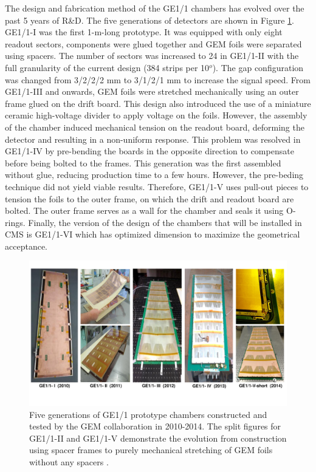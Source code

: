     The design and fabrication method of the GE1/1 chambers has evolved over the past 5 years of R\&D. The five generations of detectors are shown in Figure \ref{fig:II-1-generations}. GE1/1-I was the first 1-m-long prototype. It was equipped with only eight readout sectors, components were glued together and GEM foils were separated using spacers. The number of sectors was increased to 24 in GE1/1-II with the full granularity of the current design (384 strips per 10$^o$). The gap configuration was changed from 3/2/2/2 mm to 3/1/2/1 mm to increase the signal speed. From GE1/1-III and onwards, GEM foils were stretched mechanically using an outer frame glued on the drift board. This design also introduced the use of a miniature ceramic high-voltage divider to apply voltage on the foils. However, the assembly of the chamber induced mechanical tension on the readout board, deforming the detector and resulting in a non-uniform response. This problem was resolved in GE1/1-IV by pre-bending the boards in the opposite direction to compensate before being bolted to the frames. This generation was the first assembled without glue, reducing production time to a few hours. However, the pre-beding technique did not yield viable results. Therefore, GE1/1-V uses pull-out pieces to tension the foils to the outer frame, on which the drift and readout board are bolted. The outer frame serves as a wall for the chamber and seals it using O-rings. Finally, the version of the design of the chambers that will be installed in CMS is GE1/1-VI which has optimized dimension to maximize the geometrical acceptance.

    \begin{figure}[h!]
      \centering
      \includegraphics[width=\textwidth]{img/II-1-gem/generations.pdf}
      \caption{Five generations of GE1/1 prototype chambers constructed and tested by the GEM collaboration in 2010-2014. The split figures for GE1/1-II and GE1/1-V demonstrate the evolution from construction using spacer frames to purely mechanical stretching of GEM foils without any spacers \cite{Colaleo:2021453}.}
      \label{fig:II-1-generations}
    \end{figure}

